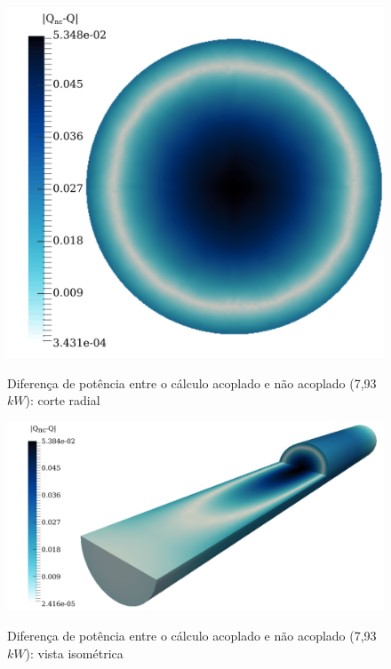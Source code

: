 \begin{figure}[htb]
  \caption{Diferença de potência entre o cálculo acoplado e não acoplado (7,93 $kW$): corte radial}
  \centering\includegraphics[scale=0.6]{figuras/diff-q-radial.png}
  \label{fig:q2}
\end{figure}

\begin{figure}[htb]
  \caption{Diferença de potência entre o cálculo acoplado e não acoplado (7,93 $kW$): vista isométrica}
  \centering\includegraphics[scale=0.5]{figuras/diff-q-isometrico.png}
  \label{fig:q3}
\end{figure}

%
%
%

